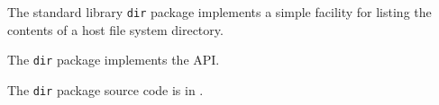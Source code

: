 
The standard library {\tt dir} package implements a simple facility for 
listing the contents of a host file system directory.

The {\tt dir} package implements the  API.

The {\tt dir} package source code is in .
